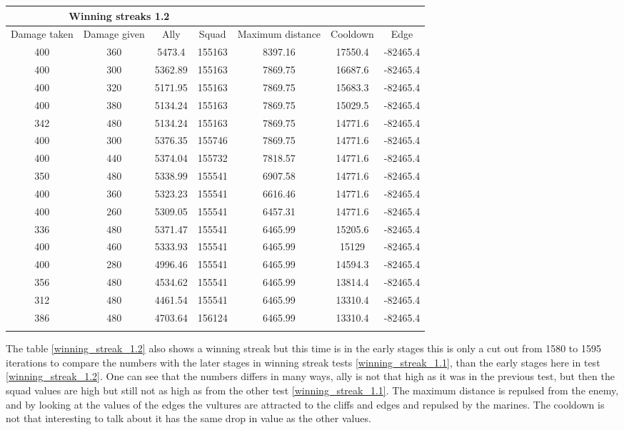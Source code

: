 






\begin{centering}
 \begin{tabular}{|c|c|c|c|c|c|c|}
	\multicolumn{4}{c}{Winning streaks 1.2} \\
	\hline
	Damage taken & Damage given & Ally & Squad & Maximum distance & Cooldown & Edge \\
	\hline
	400&		360&			5473.4&	 155163&	8397.16&		17550.4&	-82465.4\\
	400&		300&			5362.89& 155163&	7869.75&		16687.6&	-82465.4\\
	400&		320&			5171.95& 155163&	7869.75&		15683.3&	-82465.4\\
	400&		380&			5134.24& 155163&	7869.75&		15029.5&	-82465.4\\
	342&		480&			5134.24& 155163&	7869.75&		14771.6&	-82465.4\\
	400&		300&			5376.35& 155746&	7869.75&		14771.6&	-82465.4\\
	400&		440&			5374.04& 155732&	7818.57&		14771.6&	-82465.4\\
	350&		480&			5338.99& 155541&	6907.58&		14771.6&	-82465.4\\
	400&		360&			5323.23& 155541&	6616.46&		14771.6&	-82465.4\\
	400&		260&			5309.05& 155541&	6457.31&		14771.6&	-82465.4\\
	336&		480&			5371.47& 155541&	6465.99&		15205.6&	-82465.4\\
	400&		460&			5333.93& 155541&	6465.99&		15129& 		-82465.4\\
	400&		280&			4996.46& 155541&	6465.99&		14594.3&	-82465.4\\
	356&		480&			4534.62& 155541&	6465.99&		13814.4&	-82465.4\\
	312&		480&			4461.54& 155541&	6465.99&		13310.4&	-82465.4\\
	386&		480&			4703.64& 156124&	6465.99&		13310.4&	-82465.4\\
	\hline
	\label{winning_streak_1.2}
\end{tabular}
\end{centering}
The table \ref{winning_streak_1.2} also shows a winning streak but this time is in the early stages this is only a cut out from 1580 to 1595 iterations to compare the numbers with the later stages in winning streak tests \ref{winning_streak_1.1}, than the early stages here in test \ref{winning_streak_1.2}. One can see that the numbers differs in many ways, ally is not that high as it was in the previous test, but then the squad values are high but still not as high as from the other test \ref{winning_streak_1.1}. The maximum distance is repulsed from the enemy, and by looking at the values of the edges the vultures are attracted to the cliffs and edges and repulsed by the marines. The cooldown is not that interesting to talk about it has the same drop in value as the other values.

